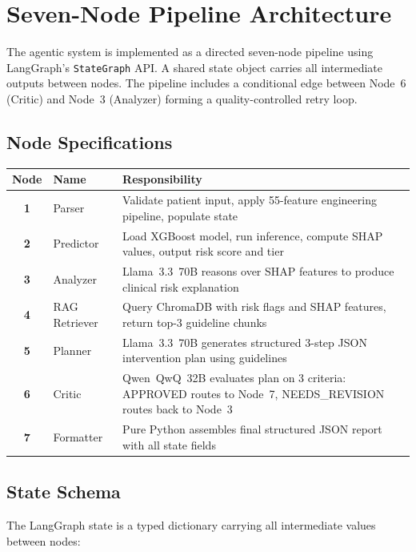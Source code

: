 \documentclass[12pt, a4paper]{report}
\begin{document}
\section{Seven-Node Pipeline Architecture}

The agentic system is implemented as a directed seven-node pipeline using LangGraph's \texttt{StateGraph} API. A shared state object carries all intermediate outputs between nodes. The pipeline includes a conditional edge between Node~6 (Critic) and Node~3 (Analyzer) forming a quality-controlled retry loop.

\subsection{Node Specifications}

\vspace{0.3cm}
\renewcommand{\arraystretch}{1.7}
\begin{tabularx}{\textwidth}{>{\bfseries\color{primaryblue}}c l X}
  \toprule
  \rowcolor{boxbg}
  \textbf{Node} & \textbf{Name} & \textbf{Responsibility} \\
  \midrule
  1 & Parser        & Validate patient input, apply 55-feature engineering pipeline, populate state \\
  2 & Predictor     & Load XGBoost model, run inference, compute SHAP values, output risk score and tier \\
  3 & Analyzer      & Llama~3.3~70B reasons over SHAP features to produce clinical risk explanation \\
  4 & RAG Retriever & Query ChromaDB with risk flags and SHAP features, return top-3 guideline chunks \\
  5 & Planner       & Llama~3.3~70B generates structured 3-step JSON intervention plan using guidelines \\
  \rowcolor{boxbg}
  6 & Critic        & Qwen~QwQ~32B evaluates plan on 3 criteria: APPROVED routes to Node~7, NEEDS\_REVISION routes back to Node~3 \\
  7 & Formatter     & Pure Python assembles final structured JSON report with all state fields \\
  \bottomrule
\end{tabularx}

\subsection{State Schema}

The LangGraph state is a typed dictionary carrying all intermediate values between nodes:
\end{document}

